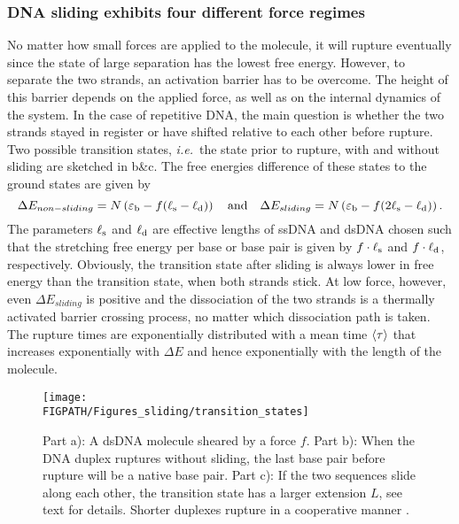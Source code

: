 \subsubsection{DNA sliding exhibits four different force regimes}
No matter how small forces are applied to the molecule, it will rupture eventually since the 
state of large separation has the lowest free energy. However, to separate the two strands, an activation
barrier has to be overcome. The height of this barrier depends on the applied force, as well as
on the internal dynamics of the system. In the case of repetitive DNA, the main question is whether
the two strands stayed in register or have shifted relative to each other before rupture.
Two possible transition states, \emph{i.e.}~the state prior to rupture, with and without sliding
are sketched in  b\&c. The free energies difference of these states to the
ground states are given by 
\begin{equation}
\label{eq:sliding_transitionstate}
\Delta E_{non-sliding}=N\left({\varepsilon_{\rm b}} - f({\ell_{\rm s}}-{\ell_{\rm d}})\right) \quad \mathrm{and}
 \quad \Delta E_{sliding}=N\left({\varepsilon_{\rm b}} - f(2{\ell_{\rm s}}-{\ell_{\rm d}})\right).
\end{equation}
The parameters ${\ell_{\rm s}}$ and ${\ell_{\rm d}}$ are effective lengths of ssDNA and dsDNA chosen such that
the stretching free energy per base or base pair is given by $f\cdot{\ell_{\rm s}}$ and $f \cdot{\ell_{\rm d}}$, respectively.
Obviously, the transition state after sliding is always lower in free energy than the 
transition state, when both strands stick. At low force, however, even $\Delta E_{sliding}$
is positive and the dissociation of the two strands is a thermally activated barrier crossing process, no matter
which dissociation path is taken.
The rupture times are exponentially distributed with a mean time $\langle \tau \rangle$ that 
increases exponentially  with $\Delta E$ and hence exponentially with the length of the molecule. 
\begin{figure} 
\centering
\texttt{[image: \\FIGPATH/Figures\_sliding/transition\_states]}
\caption[Shearing repetitive DNA.]{\label{fig:sliding_transitionstate}
Part a): A dsDNA molecule sheared by a force $f$. Part b): When the DNA duplex ruptures without sliding, the last base pair before rupture will be a native base pair. Part c): If the two sequences
slide along each other, the transition state has a larger extension $L$, see text for details. 
Shorter duplexes rupture in a cooperative manner \cite{Strunz_PNAS_99}.
}
\end{figure}
